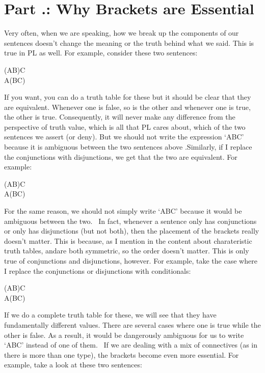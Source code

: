 \section{Part \thechapcount.\theseccount: Why Brackets are Essential}
Very often, when we are speaking, how we break up the components of our sentences doesn't change the meaning or the truth behind what we said. This is true in PL as well. For example, consider these two sentences:
\begin{center}
(A\eand B)\eand C\\
A\eand (B\eand C)
\end{center}
If you want, you can do a truth table for these but it should be clear that they are \gls{equivalent}. Whenever one is false, so is the other and whenever one is true, the other is true. Consequently, it will never make any difference from the perspective of truth value, which is all that PL cares about, which of the two sentences we assert (or deny). But we should not write the expression `A\eand B\eand C' because it is ambiguous between the two sentences above .Similarly, if I replace the conjunctions with disjunctions, we get that the two are equivalent. For example:
\begin{center}
(A\eor B)\eor C\\
A\eor (B\eor C)
\end{center}
For the same reason, we should not simply write `A\eor B\eor C' because it would be ambiguous between the two.  In fact, whenever a sentence only has conjunctions or only has disjunctions (but not both), then the placement of the brackets really doesn't matter. This is because, as I mention in the content about charateristic truth tables, \eor  and\eand  are both symmetric, so the order doesn't matter. This is only true of conjunctions and disjunctions, however. For example, take the case where I replace the conjunctions or disjunctions with conditionals:
\begin{center}
(A\eif B)\eif C\\
A\eif (B\eif C)
\end{center}
If we do a complete truth table for these, we will see that they have fundamentally different values. There are several cases where one is true while the other is false. As a result, it would be dangerously ambiguous for us to write `A\eif B\eif C' instead of one of them.  If we are dealing with a mix of connectives (as in there is more than one type), the brackets become even more essential. For example, take a look at these two sentences:
